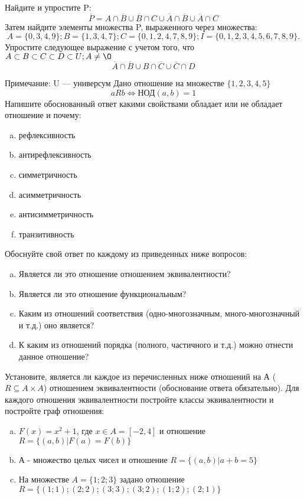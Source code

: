 \documentclass[10pt]{exam}
\begin{document}
\begin{questions}
\question
Найдите и упростите P:
\begin{equation*}
\overline{P} = A \cap \overline{B} \cup \overline{B} \cap C \cup \overline{A} \cap \overline{B} \cup \overline{A} \cap C
\end{equation*}
Затем найдите элементы множества P, выраженного через множества:
\begin{equation*}
A = \{0, 3, 4, 9\}; 
B = \{1, 3, 4, 7\};
C = \{0, 1, 2, 4, 7, 8, 9\};
I = \{0, 1, 2, 3, 4, 5, 6, 7, 8, 9\}.
\end{equation*}\question
Упростите следующее выражение с учетом того, что $A\subset B \subset C \subset D \subset U; A \neq \O$
\begin{equation*}
\overline{A} \cap \overline{B} \cup B \cap \overline{C} \cup \overline{C} \cap D
\end{equation*}

Примечание: U — универсум\question
Дано отношение на множестве $\{1, 2, 3, 4, 5\}$ 
\begin{equation*}
aRb \iff  \text{НОД}(a,b) =1
\end{equation*}
Напишите обоснованный ответ какими свойствами обладает или не обладает отношение и почему:   
\begin{enumerate} [a)]\setcounter{enumi}{0}
\item рефлексивность
\item антирефлексивность
\item симметричность
\item асимметричность
\item антисимметричность
\item транзитивность
\end{enumerate}

Обоснуйте свой ответ по каждому из приведенных ниже вопросов:
\begin{enumerate} [a)]\setcounter{enumi}{0}
    \item Является ли это отношение отношением эквивалентности?
    \item Является ли это отношение функциональным?
    \item Каким из отношений соответствия (одно-многозначным, много-многозначный и т.д.) оно является?
    \item К каким из отношений порядка (полного, частичного и т.д.) можно отнести данное отношение?
\end{enumerate}


\question
Установите, является ли каждое из перечисленных ниже отношений на А ($R \subseteq A \times A$) отношением эквивалентности (обоснование ответа обязательно). Для каждого отношения эквивалентности постройте классы эквивалентности и постройте граф отношения:
\begin{enumerate} [a)]\setcounter{enumi}{0}
\item $F(x)=x^{2}+1$, где $x \in A = [-2, 4]$ и отношение $R = \{(a,b)|F(a) = F(b)\}$
\item А - множество целых чисел и отношение $R = \{(a,b)|a + b = 5\}$
\item На множестве $A = \{1; 2; 3\}$ задано отношение $R = \{(1; 1); (2; 2); (3; 3); (3; 2); (1; 2); (2; 1)\}$


\end{enumerate}
\end{questions}
\end{document}
